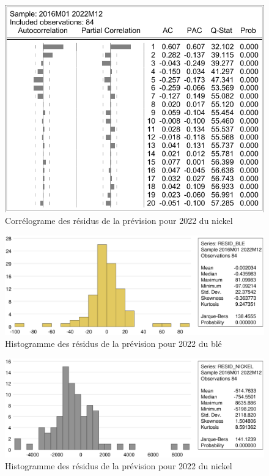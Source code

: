 \documentclass[12pt,a4paper]{article}
\begin{document}
\begin{figure}[H]
    \centering
    \includegraphics[]{annexe/3_2_2_cor_resid_nickel.pdf}
    \caption{Corrélograme des résidus de la prévision pour 2022 du nickel}
\end{figure}

\begin{figure}[H]
    \centering
    \includegraphics[width=\textwidth]{annexe/3_2_2_hist_resid_ble.eps}
    \caption{Histogramme des résidus de la prévision pour 2022 du blé}
\end{figure}

\begin{figure}[H]
    \centering
    \includegraphics[width=\textwidth]{annexe/3_2_2_hist_resid_nickel.eps}
    \caption{Histogramme des résidus de la prévision pour 2022 du nickel}
\end{figure}
\end{document}
